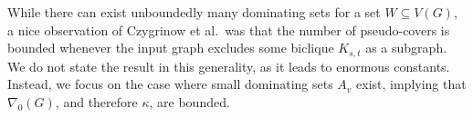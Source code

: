 
While there can exist unboundedly many dominating sets for a set $W\subseteq V(G)$,
a nice observation of Czygrinow et al.\ was that the number of
pseudo-covers is bounded whenever the input graph excludes some
biclique $K_{s,t}$ as a subgraph. We do not state the result in this
generality, as it leads to enormous constants. Instead, we focus on the
case where small dominating sets $A_v$ exist, implying that $\nabla_0(G)$,
and therefore $\kappa$, are bounded.

%
%
%
%




